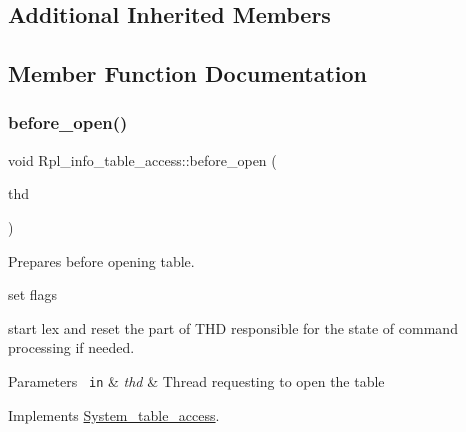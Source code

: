 \subsection*{Additional Inherited Members}


\subsection{Member Function Documentation}
\mbox{\label{classRpl__info__table__access_a6d1ae1c8dce3fd9e3f8906acef95e9e3}} 
\subsubsection{\texorpdfstring{before\+\_\+open()}{before\_open()}}
{\footnotesize\ttfamily void Rpl\+\_\+info\+\_\+table\+\_\+access\+::before\+\_\+open (\begin{DoxyParamCaption}\item[{T\+HD $\ast$}]{thd }\end{DoxyParamCaption})\hspace{0.3cm}{\ttfamily [virtual]}}

Prepares before opening table.
\begin{DoxyItemize}
\item set flags
\item start lex and reset the part of T\+HD responsible for the state of command processing if needed.
\end{DoxyItemize}


\begin{DoxyParams}[1]{Parameters}
\mbox{\texttt{ in}}  & {\em thd} & Thread requesting to open the table \\
\hline
\end{DoxyParams}


Implements \mbox{\hyperlink{classSystem__table__access_a7357c29323649f270cf35b08cd8fe826}{System\+\_\+table\+\_\+access}}.

\mbox{\label{classRpl__info__table__access_a794ff171859b531d48de28866f928953}} 
